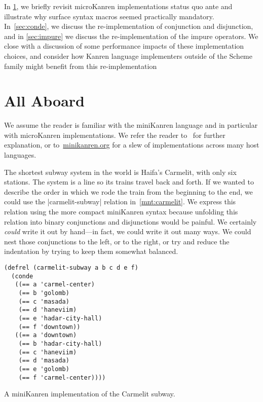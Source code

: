 \documentclass[sigplan,screen,draft,anonymous,review,natbib=false]{acmart}
\begin{document}
In \cref{sec:all-aboard}, we briefly revisit microKanren implementations
status quo ante and illustrate why surface syntax macros seemed
practically mandatory. In~\cref{sec:conde}, we discuss the
re-implementation of conjunction and disjunction, and in
\cref{sec:impure} we discuss the re-implementation of the impure
operators. We close with a discussion of some performance impacts of
these implementation choices, and consider how Kanren language
implementers outside of the Scheme family might benefit from this
re-implementation

\section{All Aboard}\label{sec:all-aboard}

We assume the reader is familiar with the miniKanren language and in
particular with microKanren implementations. We refer the reader
to~\cite{friedman2018reasoned,hemann2013muKanren,hemann2016small} for
further explanation, or to~\href{minikanren.org}{minikanren.org} for a
slew of implementations across many host languages.

The shortest subway system in the world is Haifa's Carmelit, with only
six stations. The system is a line so its trains travel back and
forth. If we wanted to describe the order in which we rode the train
from the beginning to the end, we could use the
\rackinline|carmelit-subway| relation in~\cref{mnt:carmelit}. We
express this relation using the more compact miniKanren syntax because
unfolding this relation into binary conjunctions and disjunctions
would be painful. We certainly \emph{could} write it out by hand---in
fact, we could write it out many ways. We could nest those
conjunctions to the left, or to the right, or try and reduce the
indentation by trying to keep them somewhat balanced.

\begin{listing}
  \begin{verbatim}
(defrel (carmelit-subway a b c d e f)
  (conde
   ((== a 'carmel-center)
    (== b 'golomb)
    (== c 'masada)
    (== d 'haneviim)
    (== e 'hadar-city-hall)
    (== f 'downtown))
   ((== a 'downtown)
    (== b 'hadar-city-hall)
    (== c 'haneviim)
    (== d 'masada)
    (== e 'golomb)
    (== f 'carmel-center))))
  \end{verbatim}
  \caption{A miniKanren implementation of the Carmelit subway.}
  \label{mnt:carmelit}
\end{listing}
\end{document}
